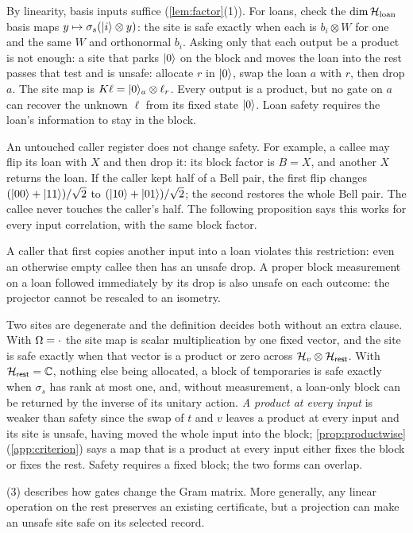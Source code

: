 \documentclass[acmsmall,screen,review,anonymous,nonacm]{acmart}
\begin{document}
By linearity, basis inputs suffice (\cref{lem:factor}(1)). For loans,
check the $\dim\mathcal{H}_{\mathrm{loan}}$ basis maps
$y \mapsto \sigma_s(\lvert i \rangle \otimes y)$: the site
is safe exactly when each is $b_i \otimes W$ for one and the same $W$ and
orthonormal $b_i$. Asking only that each output be a product is not enough:
a site that parks $\lvert 0 \rangle$ on the block and moves the loan into the rest
passes that test and is unsafe:
allocate $r$ in $\lvert 0 \rangle$, swap the loan $a$ with $r$, then drop $a$.
The site map is $K\ell=\lvert 0 \rangle_a\otimes\ell_r$. Every output is a product,
but no gate on $a$ can recover the unknown $\ell$ from its fixed state
$\lvert 0 \rangle$. Loan safety requires the loan's information to stay in the block.

An untouched caller register does not change safety. For example, a
callee may flip its loan with $X$ and then drop it: its block factor is
$B=X$, and another $X$ returns the loan. If the caller kept half of a Bell
pair, the first flip changes $(\lvert 00 \rangle+\lvert 11 \rangle)/\sqrt2$ to
$(\lvert 10 \rangle+\lvert 01 \rangle)/\sqrt2$; the second restores the whole Bell pair.
The callee never touches the caller's half. The following proposition
says this works for every input correlation, with the same block factor.

\stmtModular

A caller that first copies another input into a loan violates this
restriction: even an otherwise empty callee then has an unsafe drop. A proper block measurement on a loan followed
immediately by its drop is also unsafe on each outcome: the projector
cannot be rescaled to an isometry.

Two sites are degenerate and the definition decides both without an
extra clause. With $\Omega = \cdot$ the site map is scalar
multiplication by one fixed vector, and the site is safe exactly when
that vector is a product or zero across $\mathcal{H}_{v} \otimes \mathcal{H}_{\mathsf{rest}}$. With
$\mathcal{H}_{\mathsf{rest}} = \mathbb{C}$, nothing else being allocated, a block of temporaries is
safe exactly when $\sigma_s$ has rank at most one, and, without measurement, a loan-only block
can be returned by the inverse of its unitary action. \emph{A
  product at every input} is weaker than safety since the swap of $t$
and $v$ leaves a product at every input and its site is unsafe, having
moved the whole input into the block; \cref{prop:productwise}
(\cref{app:criterion}) says a map that is a product at every input
either fixes the block or fixes the rest. Safety requires a fixed block;
the two forms can overlap.

(3) describes how gates change the Gram matrix.
More generally, any linear operation on the rest preserves an existing
certificate, but a projection can make an unsafe site safe on its
selected record.
\end{document}
